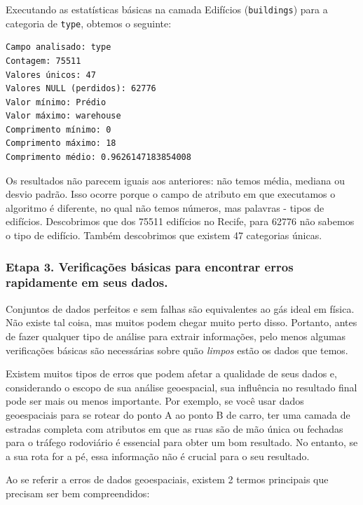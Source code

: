 \documentclass[
]{book}
\begin{document}
Executando as estatísticas básicas na camada Edifícios (\texttt{buildings}) para a categoria de \texttt{type}, obtemos o seguinte:

\begin{verbatim}
Campo analisado: type
Contagem: 75511
Valores únicos: 47
Valores NULL (perdidos): 62776
Valor mínimo: Prédio
Valor máximo: warehouse
Comprimento mínimo: 0
Comprimento máximo: 18
Comprimento médio: 0.9626147183854008
\end{verbatim}

Os resultados não parecem iguais aos anteriores: não temos média, mediana ou desvio padrão. Isso ocorre porque o campo de atributo em que executamos o algoritmo é diferente, no qual não temos números, mas palavras - tipos de edifícios. Descobrimos que dos 75511 edifícios no Recife, para 62776 não sabemos o tipo de edifício. Também descobrimos que existem 47 categorias únicas.

\hypertarget{etapa-3.-verificauxe7uxf5es-buxe1sicas-para-encontrar-erros-rapidamente-em-seus-dados.}{%
\subsubsection{\texorpdfstring{\textbf{Etapa 3. Verificações básicas para encontrar erros rapidamente em seus dados.}}{Etapa 3. Verificações básicas para encontrar erros rapidamente em seus dados.}}\label{etapa-3.-verificauxe7uxf5es-buxe1sicas-para-encontrar-erros-rapidamente-em-seus-dados.}}

Conjuntos de dados perfeitos e sem falhas são equivalentes ao gás ideal em física. Não existe tal coisa, mas muitos podem chegar muito perto disso. Portanto, antes de fazer qualquer tipo de análise para extrair informações, pelo menos algumas verificações básicas são necessárias sobre quão \emph{limpos} estão os dados que temos.

Existem muitos tipos de erros que podem afetar a qualidade de seus dados e, considerando o escopo de sua análise geoespacial, sua influência no resultado final pode ser mais ou menos importante. Por exemplo, se você usar dados geoespaciais para se rotear do ponto A ao ponto B de carro, ter uma camada de estradas completa com atributos em que as ruas são de mão única ou fechadas para o tráfego rodoviário é essencial para obter um bom resultado. No entanto, se a sua rota for a pé, essa informação não é crucial para o seu resultado.

Ao se referir a erros de dados geoespaciais, existem 2 termos principais que precisam ser bem compreendidos:
\end{document}
